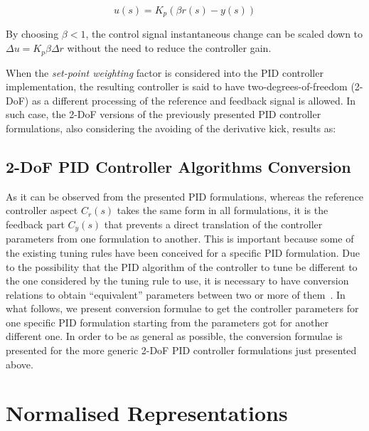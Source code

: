 \begin{equation}
u(s)=K_p(\beta r(s) - y(s))
\end{equation}

By choosing $\beta < 1$, the control signal instantaneous change can be scaled down to $\Delta u = K_p \beta \Delta r$  without the need to reduce the controller gain. 

When the \emph{set-point weighting} factor is considered into the PID controller implementation, the resulting controller is said to have two-degrees-of-freedom (2-DoF) as a different processing of the reference and feedback signal is allowed. In such case, the 2-DoF versions of the previously presented PID controller formulations, also considering the avoiding of the derivative kick, results as:

\subsection{2-DoF PID Controller Algorithms Conversion}
As it can be observed from the presented PID formulations, whereas the reference controller aspect $C_r(s)$ takes the same form in all formulations, it is the feedback part $C_y(s)$  that prevents a direct translation of the controller parameters from one formulation to another. This is important because some of the existing tuning rules have been conceived for a specific PID formulation. Due to the possibility that the PID algorithm of the controller to tune be different to the one considered by the tuning rule to use, it is necessary to have conversion relations to obtain ``equivalent'' parameters between two or more of them~\citep{alfaroetfa2012-2, vilanova2017WEE}. In what follows, we present conversion formulae to get the controller parameters for one specific PID formulation starting from the parameters got for another different one. In order to be as general as possible, the conversion formulae is presented for the more generic 2-DoF PID controller formulations just presented above.


\section{Normalised Representations}
\label{sec:3}

